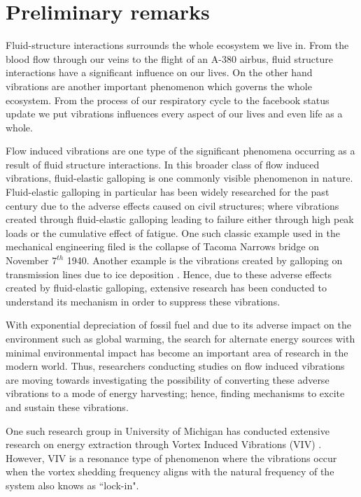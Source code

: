 \chapter{Preliminary remarks}

Fluid-structure interactions surrounds the whole ecosystem we live in. From the blood flow through our veins to the flight of an A-380 airbus, fluid structure interactions have a significant influence on our lives. On the other hand vibrations are another important phenomenon which governs the whole ecosystem. From the process of our respiratory cycle to the facebook status update we put vibrations influences every aspect of our lives and even life as a whole.  


Flow induced vibrations are one type of the significant phenomena occurring as a result of fluid structure interactions. In this broader class of flow induced vibrations, fluid-elastic galloping is one commonly visible phenomenon in nature. Fluid-elastic galloping in particular has been widely researched for the past century due to the adverse effects caused on civil structures; where vibrations created through fluid-elastic galloping  leading to failure either through high peak loads or the cumulative effect of fatigue. One such classic example used in the mechanical engineering filed is the collapse of Tacoma Narrows bridge on November $7^{th}$ 1940. Another example is the vibrations created by galloping on transmission lines due to ice deposition \citep{Parkinson1964}. Hence, due to these adverse effects created by fluid-elastic galloping, extensive research has been conducted to understand its mechanism in order to suppress these vibrations.  

With exponential depreciation of  fossil fuel and due to its adverse impact on the environment such as global warming, the search for alternate energy sources with minimal environmental impact has become an important area of research in the modern world. Thus, researchers conducting studies on flow induced vibrations are moving towards investigating the possibility of converting these adverse vibrations to a mode of energy harvesting; hence, finding mechanisms to excite and sustain these vibrations\citep{Barrero-Gil2010a}.  

One such research group in University of Michigan has conducted extensive research on energy extraction through Vortex Induced Vibrations (VIV) \citep{Bernitsas2008a-concept, Bernitsas2009, Raghavan2010a, Lee2011b}. However, VIV is a resonance type of phenomenon where the vibrations occur when the vortex shedding frequency aligns with the natural frequency of the system also knows as ``lock-in".

